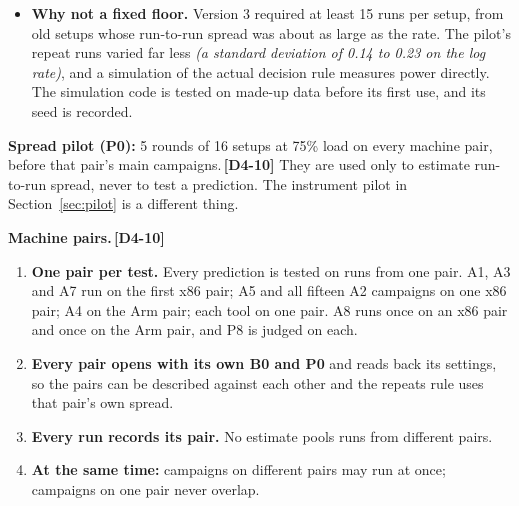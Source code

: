 \documentclass[11pt]{article}
\newcommand{\gl}[1]{{\color{soft}\itshape\small (#1)}}
\newcommand{\chgold}[1]{\,{\color{oldcol}\bfseries\footnotesize[#1]}}
\begin{document}
\begin{itemize}
  \item \textbf{Why not a fixed floor.} Version 3 required at least 15 runs per setup, from old setups whose run-to-run spread was about as large as the rate. The pilot's repeat runs varied far less \gl{a standard deviation of 0.14 to 0.23 on the log rate}, and a simulation of the actual decision rule measures power directly. The simulation code is tested on made-up data before its first use, and its seed is recorded.
\end{itemize}

\textbf{Spread pilot (P0):} 5 rounds of 16 setups at 75\% load on every machine pair, before that pair's main campaigns.\chgold{D4-10} They are used only to estimate run-to-run spread, never to test a prediction. The instrument pilot in Section~\ref{sec:pilot} is a different thing.

\textbf{Machine pairs.}\chgold{D4-10}
\begin{enumerate}
  \item \textbf{One pair per test.} Every prediction is tested on runs from one pair. A1, A3 and A7 run on the first x86 pair; A5 and all fifteen A2 campaigns on one x86 pair; A4 on the Arm pair; each tool on one pair. A8 runs once on an x86 pair and once on the Arm pair, and P8 is judged on each.
  \item \textbf{Every pair opens with its own B0 and P0} and reads back its settings, so the pairs can be described against each other and the repeats rule uses that pair's own spread.
  \item \textbf{Every run records its pair.} No estimate pools runs from different pairs.
  \item \textbf{At the same time:} campaigns on different pairs may run at once; campaigns on one pair never overlap.
\end{enumerate}
\end{document}
